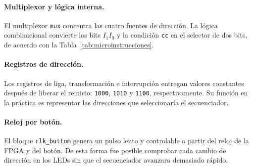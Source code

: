 \documentclass[letterpaper,12pt]{article}
\begin{document}




\paragraph{Multiplexor y lógica interna.} El multiplexor \texttt{mux} concentra las cuatro fuentes de dirección. La lógica combinacional convierte los bits $I_1I_0$ y la condición \texttt{cc} en el selector de dos bits, de acuerdo con la Tabla~\ref{tab:microinstrucciones}.





\paragraph{Registros de dirección.} Los registros de liga, transformación e interrupción entregan valores constantes después de liberar el reinicio: \texttt{1000}, \texttt{1010} y \texttt{1100}, respectivamente. Su función en la práctica es representar las direcciones que seleccionaría el secuenciador.







\paragraph{Reloj por botón.} El bloque \texttt{clk\_buttom} genera un pulso lento y controlable a partir del reloj de la FPGA y del botón. De esta forma fue posible comprobar cada cambio de dirección en los LEDs sin que el secuenciador avanzara demasiado rápido.
\end{document}
